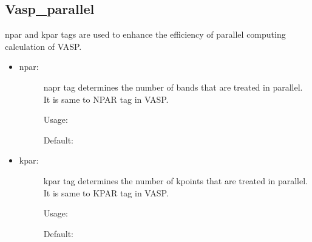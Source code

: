 \documentclass[letterpaper,10pt,english]{sphinxmanual}
\begin{document}
\subsection{Vasp\_parallel}
\label{\detokenize{Input/Configuration:vasp-parallel}}
npar and kpar tags are used to enhance the efficiency of parallel computing calculation of VASP.
\begin{itemize}
\item {} \begin{description}
\item[{npar:}] \leavevmode
napr tag determines the number of bands that are treated in parallel. It is same to NPAR tag in VASP.

Usage:

\begin{sphinxVerbatim}[commandchars=\\\{\}]
   \PYG{p}{[}\PYG{p}{]}
\end{sphinxVerbatim}

Default:

\begin{sphinxVerbatim}[commandchars=\\\{\}]
   
\end{sphinxVerbatim}

\end{description}

\item {} \begin{description}
\item[{kpar:}] \leavevmode
kpar tag determines the number of kpoints that are treated in parallel. It is same to KPAR tag in VASP.

Usage:

\begin{sphinxVerbatim}[commandchars=\\\{\}]
   \PYG{p}{[}\PYG{p}{]}
\end{sphinxVerbatim}

Default:

\begin{sphinxVerbatim}[commandchars=\\\{\}]
   
\end{sphinxVerbatim}

\end{description}

\end{itemize}
\end{document}
